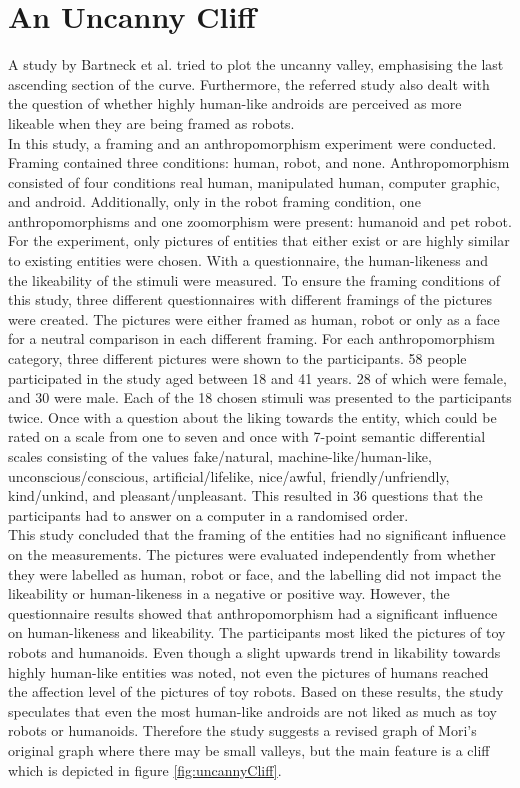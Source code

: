 \section{An Uncanny Cliff}
A study by Bartneck et al. \cite{uncanny_cliff} tried to plot the uncanny valley, emphasising the last ascending section of the curve. Furthermore, the referred study also dealt with the question of whether highly human-like androids are perceived as more likeable when they are being framed as robots.\\
In this study, a framing and an anthropomorphism experiment were conducted. Framing contained three conditions: human, robot, and none. Anthropomorphism consisted of four conditions real human, manipulated human, computer graphic, and android. Additionally, only in the robot framing condition, one anthropomorphisms and one zoomorphism were present: humanoid and pet robot. For the experiment, only pictures of entities that either exist or are highly similar to existing entities were chosen. 
With a questionnaire, the human-likeness and the likeability of the stimuli were measured.
To ensure the framing conditions of this study, three different questionnaires with different framings of the pictures were created. The pictures were either framed as human, robot or only as a face for a neutral comparison in each different framing. For each anthropomorphism category, three different pictures were shown to the participants. 
58 people participated in the study aged between 18 and 41 years. 28 of which were female, and 30 were male.
Each of the 18 chosen stimuli was presented to the participants twice. Once with a question about the liking towards the entity, which could be rated on a scale from one to seven and once with 7-point semantic differential scales consisting of the values fake/natural, machine-like/human-like, unconscious/conscious, artificial/lifelike, nice/awful, friendly/unfriendly, kind/unkind, and pleasant/unpleasant. This resulted in 36 questions that the participants had to answer on a computer in a randomised order.\\
This study concluded that the framing of the entities had no significant influence on the measurements. The pictures were evaluated independently from whether they were labelled as human, robot or face, and the labelling did not impact the likeability or human-likeness in a negative or positive way.
 However, the questionnaire results showed that anthropomorphism had a significant influence on human-likeness and likeability. The participants most liked the pictures of toy robots and humanoids. Even though a slight upwards trend in likability towards highly human-like entities was noted, not even the pictures of humans reached the affection level of the pictures of toy robots. Based on these results, the study speculates that even the most human-like androids are not liked as much as toy robots or humanoids. Therefore the study suggests a revised graph of Mori's original graph where there may be small valleys, but the main feature is a cliff which is depicted in figure \ref{fig:uncannyCliff}.
